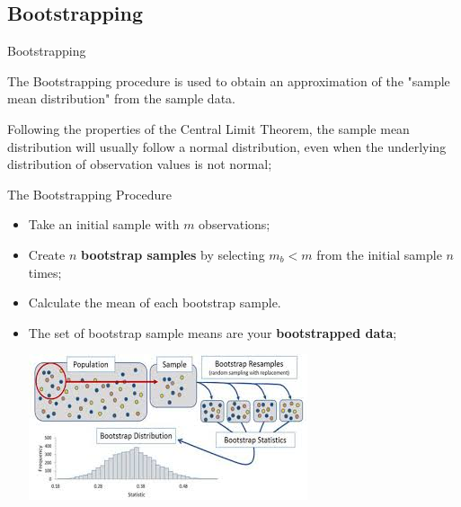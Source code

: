 \subsection{Bootstrapping}

\begin{frame}{Bootstrapping}{}

  The Bootstrapping procedure is used to obtain an approximation of the "sample mean distribution" from the sample data.\bigskip

  Following the properties of the Central Limit Theorem, the sample mean distribution will usually follow a normal distribution, even when the underlying distribution of observation values is not normal;
\end{frame}

\begin{frame}{The Bootstrapping Procedure}
  \begin{itemize}
    \item Take an initial sample with $m$ observations;
    \item Create $n$ {\bf bootstrap samples} by selecting $m_b < m$ from the initial sample $n$ times;
    \item Calculate the mean of each bootstrap sample.
    \item The set of bootstrap sample means are your {\bf bootstrapped data};

    \begin{center}
      \includegraphics[width=.8\textwidth]{../img/bootstrap_lowres}
    \end{center}
  \end{itemize}
\end{frame}



